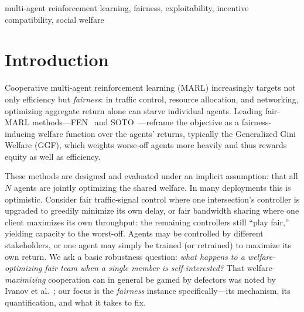 \documentclass[conference, a4paper]{IEEEtran}
\begin{document}
\renewcommand{\IEEEkeywordsname}{Keywords}
\begin{IEEEkeywords}
multi-agent reinforcement learning, fairness, exploitability, incentive
compatibility, social welfare
\end{IEEEkeywords}

\section{Introduction}
Cooperative multi-agent reinforcement learning (MARL) increasingly targets not
only efficiency but \emph{fairness}: in traffic control, resource allocation, and
networking, optimizing aggregate return alone can starve individual agents.
Leading fair-MARL methods---FEN~\cite{jiang2019fen} and
SOTO~\cite{zimmer2021soto}---reframe the objective as a fairness-inducing welfare
function over the agents' returns, typically the Generalized Gini Welfare (GGF),
which weights worse-off agents more heavily and thus rewards equity as well as
efficiency.

These methods are designed and evaluated under an implicit assumption: that all
$N$ agents are jointly optimizing the shared welfare. In many deployments this is
optimistic. Consider fair traffic-signal control where one intersection's
controller is upgraded to greedily minimize its own delay, or fair bandwidth
sharing where one client maximizes its own throughput: the remaining controllers
still ``play fair,'' yielding capacity to the worst-off. Agents may be controlled
by different stakeholders, or one agent may simply be trained (or retrained) to
maximize its own return. We ask a basic robustness question: \emph{what happens to
a welfare-optimizing fair team when a single member is self-interested?} That
welfare-\emph{maximizing} cooperation can in general be gamed by defectors was
noted by Ivanov et al.~\cite{ivanov2023mediated}; our focus is the \emph{fairness}
instance specifically---its mechanism, its quantification, and what it takes to
fix.
\end{document}
